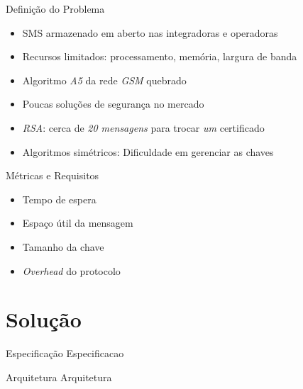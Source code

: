 \documentclass[notes,blue,mathserif]{beamer}
\begin{document}
\begin{frame}{Defini\c{c}\~{a}o do Problema}
\begin{itemize}[<+->]
\item SMS armazenado em aberto nas integradoras\/ e operadoras
\item Recursos limitados: processamento, mem\'{o}ria, largura de banda
\item Algoritmo \emph{A5} da rede \emph{GSM} quebrado
\item Poucas solu\c{c}\~{o}es de seguran\c{c}a no mercado
\item \emph{RSA}: cerca de \textit{20 mensagens} para trocar \textit{um} certificado
\item Algoritmos sim\'{e}tricos: Dificuldade em gerenciar as chaves
\end{itemize}
\end{frame}


\begin{frame}{M\'{e}tricas e Requisitos}
\begin{itemize}[<+->]
\item Tempo de espera
\item Espa\c{c}o \'{u}til da mensagem
\item Tamanho da chave
\item \textit{Overhead} do protocolo
\end{itemize}
\end{frame}

\section{Solu\c{c}\~{a}o}

\begin{frame}{Especifica\c{c}\~{a}o}
Especificacao
\end{frame}

\begin{frame}{Arquitetura}
Arquitetura
\end{frame}
\end{document}
